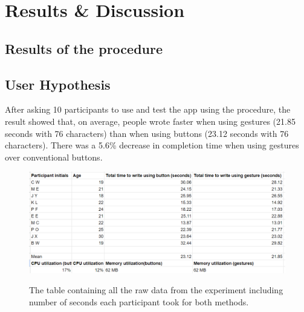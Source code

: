 \documentclass[conference]{IEEEtran}
\begin{document}
\section{Results \& Discussion}
\subsection{Results of the procedure}

\subsection*{User Hypothesis}

After asking 10 participants to use and test the app using the procedure, the result showed that, on average, people wrote faster when using gestures (21.85 seconds with 76 characters) than when using buttons (23.12 seconds with 76 characters). There was a 5.6\% decrease in completion time when using gestures over conventional buttons.
\begin{figure}[ht]
    \centering
    \includegraphics[scale=0.3]{images/table.png}\\
    \caption{The table containing all the raw data from the experiment including number of seconds each participant took for both methods.}
    \label{fig:enter-label}
\end{figure}
\end{document}
